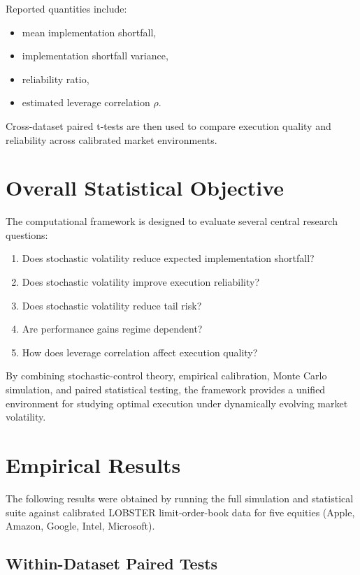 \documentclass[11pt]{article}
\begin{document}
Reported quantities include:
\begin{itemize}
\item mean implementation shortfall,
\item implementation shortfall variance,
\item reliability ratio,
\item estimated leverage correlation $\rho$.
\end{itemize}

Cross-dataset paired t-tests are then used to compare execution quality and reliability across calibrated market environments.

\section{Overall Statistical Objective}

The computational framework is designed to evaluate several central research questions:
\begin{enumerate}
\item Does stochastic volatility reduce expected implementation shortfall?
\item Does stochastic volatility improve execution reliability?
\item Does stochastic volatility reduce tail risk?
\item Are performance gains regime dependent?
\item How does leverage correlation affect execution quality?
\end{enumerate}

By combining stochastic-control theory, empirical calibration, Monte Carlo simulation, and paired statistical testing, the framework provides a unified environment for studying optimal execution under dynamically evolving market volatility.

\section{Empirical Results}

The following results were obtained by running the full simulation and statistical suite against calibrated LOBSTER limit-order-book data for five equities (Apple, Amazon, Google, Intel, Microsoft).

\subsection{Within-Dataset Paired Tests}
\end{document}
